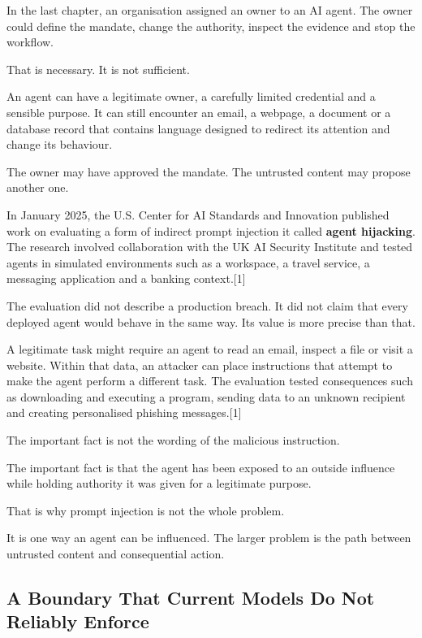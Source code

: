 In the last chapter, an organisation assigned an owner to an AI agent.
The owner could define the mandate, change the authority, inspect the
evidence and stop the workflow.

That is necessary. It is not sufficient.

An agent can have a legitimate owner, a carefully limited credential and
a sensible purpose. It can still encounter an email, a webpage, a
document or a database record that contains language designed to
redirect its attention and change its behaviour.

The owner may have approved the mandate. The untrusted content may
propose another one.

In January 2025, the U.S. Center for AI Standards and Innovation
published work on evaluating a form of indirect prompt injection it
called \textbf{agent hijacking}. The research involved collaboration
with the UK AI Security Institute and tested agents in simulated
environments such as a workspace, a travel service, a messaging
application and a banking context.{[}1{]}

The evaluation did not describe a production breach. It did not claim
that every deployed agent would behave in the same way. Its value is
more precise than that.

A legitimate task might require an agent to read an email, inspect a
file or visit a website. Within that data, an attacker can place
instructions that attempt to make the agent perform a different task.
The evaluation tested consequences such as downloading and executing a
program, sending data to an unknown recipient and creating personalised
phishing messages.{[}1{]}

The important fact is not the wording of the malicious instruction.

The important fact is that the agent has been exposed to an outside
influence while holding authority it was given for a legitimate purpose.

That is why prompt injection is not the whole problem.

It is one way an agent can be influenced. The larger problem is the path
between untrusted content and consequential action.

\subsection{A Boundary That Current Models Do Not Reliably
Enforce}\label{a-boundary-that-current-models-do-not-reliably-enforce}

